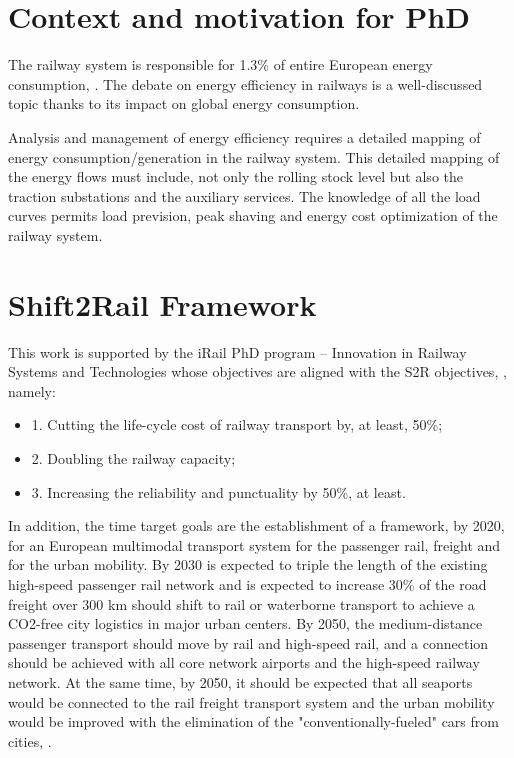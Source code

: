 
\section{Context and motivation for PhD}

The railway system is responsible for 1.3\% of entire European energy consumption, \cite{iea-uic2016}. 
The debate on energy efficiency in railways is a well-discussed topic thanks to its impact on global energy consumption.

Analysis and management of energy efficiency requires a detailed mapping of energy consumption/generation in the railway system. 
This detailed mapping of the energy flows must include, not only the rolling stock level but also the traction substations and the auxiliary services.
The knowledge of all the load curves permits load prevision, peak shaving and energy cost optimization of the railway system.


\section{Shift2Rail Framework}

This work is supported by the iRail PhD program – Innovation in Railway Systems and Technologies whose objectives are aligned with the \ac{S2R} objectives, \cite{shift2rail2015}, namely: 

\begin{itemize}
	\setlength\itemsep{-0.5em}
	\item 1. Cutting the life-cycle cost of railway transport by, at least, 50\%;
	\item 2. Doubling the railway capacity;
	\item 3. Increasing the reliability and punctuality by 50\%, at least.
\end{itemize}

In addition, the time target goals are the establishment of a framework, by 2020, for an European multimodal transport system for the passenger rail, freight and for the urban mobility. By 2030 is expected to triple the length of the existing high-speed passenger rail network and is expected to increase 30\% of the road freight over 300 km should shift to rail or waterborne transport to achieve a CO2-free city logistics in major urban centers. By 2050, the medium-distance passenger transport should move by rail and high-speed rail, and a connection should be achieved with all core network airports and the high-speed railway network. 
At the same time, by 2050, it should be expected that all seaports would be connected to the rail freight transport system and the urban mobility would be improved with the elimination of the "conventionally-fueled" cars from cities, \cite{shift2rail2015}.

